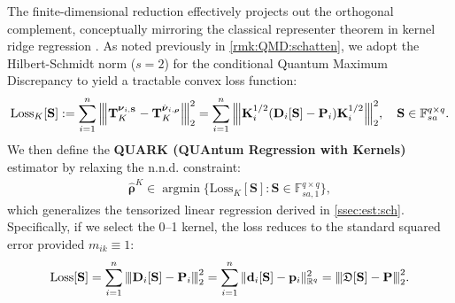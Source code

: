 \documentclass[noinfoline]{imsart}\setcounter{tocdepth}{2}
\renewcommand{\b}[1]{\mathbb{#1}} %
\newcommand{\m}[1]{\mathbf{#1}} %
\newcommand{\f}[1]{\mathfrak{#1}} %
\newcommand{\mb}[1]{\boldsymbol{#1}} %
\newcommand{\vertiii}[1]{{\left\vert\kern-0.25ex\left\vert\kern-0.25ex\left\vert #1 
    \right\vert\kern-0.25ex\right\vert\kern-0.25ex\right\vert}} %
\DeclareMathOperator*{\argmin}{\arg\min}
\theoremstyle{plain}
\begin{document}
The finite-dimensional reduction effectively projects out the orthogonal complement, conceptually mirroring the classical representer theorem in kernel ridge regression \cite{paulsen2016introduction}. As noted previously in \cref{rmk:QMD:schatten}, we adopt the Hilbert-Schmidt norm ($s=2$) for the conditional Quantum Maximum Discrepancy to yield a tractable convex loss function:
\begin{align*}
    \mathrm{Loss}_{K}[\m{S}] := \sum_{i=1}^{n} \vertiii{\m{T}_{K}^{\mb{\nu}_{i, \m{S}}} - \m{T}_{K}^{\hat{\mb{\nu}}_{i, \mb{\rho}}}}_{2}^{2} = \sum_{i=1}^{n} \vertiii{\m{K}_{i}^{1/2} (\m{D}_{i}[\m{S}] - \m{P}_{i}) \m{K}_{i}^{1/2}}_{2}^{2}, \quad \m{S} \in \b{F}_{sa}^{q \times q}.
\end{align*}
We then define the \textbf{QUARK (QUAntum Regression with Kernels)} estimator by relaxing the n.n.d. constraint:
\begin{align}\label{eq:def:density:est:ker}
    \hat{\mb{\rho}}^{K} \in \argmin \{\mathrm{Loss}_{K}[\m{S}] : \m{S} \in \b{F}_{sa, 1}^{q \times q}\},  
\end{align}
which generalizes the tensorized linear regression derived in \cref{ssec:est:sch}. Specifically, if we select the 0--1 kernel, the loss reduces to the standard squared error provided $m_{ik} \equiv 1$:
\begin{align*}
    \mathrm{Loss}[\m{S}] = \sum_{i=1}^{n} \vertiii{ \m{D}_{i}[\m{S}] - \m{P}_{i} }_{2}^{2} = \sum_{i=1}^{n} \|\m{d}_{i}[\m{S}] - \m{p}_{i}\|_{\b{R}^{q}}^{2} = \vertiii{\f{D}[\m{S}] - \m{P}}_{2}^{2}.
\end{align*}
\end{document}
